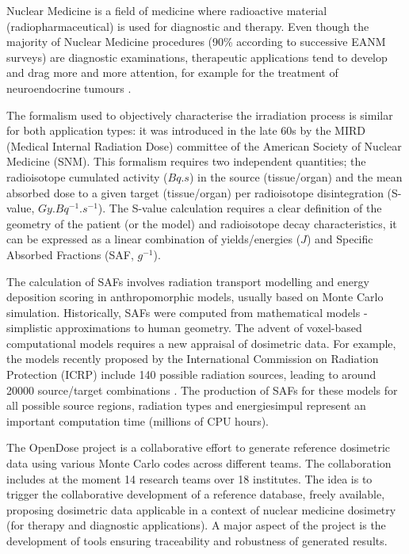 \begin{task}[
  title=Nuclear Medicine application,
  id=opendose-analysis,
  lead=INSERM,
  PM=24,
  wphases={3-33},
  partners={XFEL}
]
  Nuclear Medicine is a field of medicine where radioactive material
  (radiopharmaceutical) is used for diagnostic and therapy. Even though the
  majority of Nuclear Medicine procedures (90\% according to successive EANM
  surveys) are diagnostic examinations, therapeutic applications tend to
  develop and drag more and more attention, for example for the treatment of
  neuroendocrine tumours \cite{Bodei2009}.

  The formalism used to objectively characterise the irradiation process is
  similar for both application types: it was introduced in the late 60s by the
  MIRD (Medical Internal Radiation Dose) committee of the American Society of
  Nuclear Medicine (SNM). This formalism \cite{loevinger1991mird} requires two
  independent quantities; the radioisotope cumulated activity ($Bq.s$) in the
  source (tissue/organ) and the mean absorbed dose to a given target
  (tissue/organ) per radioisotope disintegration (S-value,
  $Gy.Bq^{-1}.s^{-1}$). The S-value calculation requires a clear definition of
  the geometry of the patient (or the model) and radioisotope decay
  characteristics, it can be expressed as a linear combination of
  yields/energies ($J$) and Specific Absorbed Fractions (SAF, $g^{-1}$).

  The calculation of SAFs involves radiation transport modelling and energy
  deposition scoring in anthropomorphic models, usually based on Monte Carlo
  simulation. Historically, SAFs were computed from mathematical models -
  simplistic approximations to human geometry. The advent of voxel-based
  computational models requires a new appraisal of dosimetric data. For
  example, the models recently proposed by the International Commission on
  Radiation Protection (ICRP) include 140 possible radiation sources, leading
  to around 20000 source/target combinations \cite{ICRP2009ICRPPhantoms}. The
  production of SAFs for these models for all possible source regions,
  radiation types and energiesimpul represent an important computation time
  (millions of CPU hours).

  The OpenDose project \cite{Chauvin2017} is a collaborative effort to generate
  reference dosimetric data using various Monte Carlo codes across different
  teams. The collaboration includes at the moment 14 research teams over 18
  institutes.  The idea is to trigger the collaborative development of a
  reference database, freely available, proposing dosimetric data applicable in
  a context of nuclear medicine dosimetry (for therapy and diagnostic
  applications). A major aspect of the project is the development of tools
  ensuring traceability and robustness of generated results.


\end{task}
